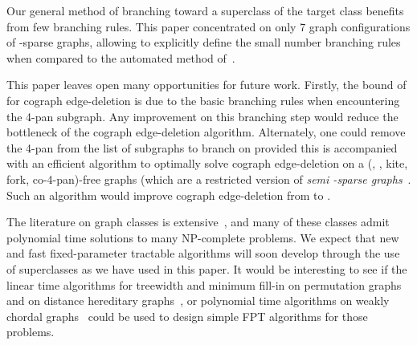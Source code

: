 \documentclass{llncs}
\begin{document}
Our general method of branching toward a superclass of the target class benefits from few branching rules. This paper concentrated on only 7 graph configurations of -sparse graphs, allowing to explicitly define the small number branching rules when compared to the automated method of~\cite{GGHN}.

This paper leaves open many opportunities for future work. Firstly, the bound of  for cograph edge-deletion is due to the basic branching rules when encountering the 4-pan subgraph. Any improvement on this branching step would reduce the bottleneck of the cograph edge-deletion algorithm. Alternately, one could remove the 4-pan from the list of subgraphs to branch on provided this is accompanied with an efficient algorithm to optimally solve cograph edge-deletion on a (, , kite, fork, co-4-pan)-free graphs (which are a restricted version of \emph{semi -sparse graphs}~\cite{FG}. Such an algorithm would improve cograph edge-deletion from  to .

The literature on graph classes is extensive~\cite{BLS}, and many of these classes admit polynomial time solutions to many NP-complete problems. We expect that new and fast fixed-parameter tractable algorithms will soon develop through the use of superclasses as we have used in this paper. It would be interesting to see if the linear time algorithms for treewidth and minimum fill-in on permutation graphs~\cite{Mei} and on distance hereditary graphs~\cite{BDK}, or polynomial time algorithms on weakly chordal graphs~\cite{BT99} could be used to design simple FPT algorithms for those problems.





\end{document}

